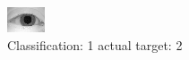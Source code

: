 \begin{figure}[h!]
\begin{center}
\includegraphics[width=0.60\columnwidth]{figures/ID870_class_1_target_2.png}
\end{center}
\caption{ Classification: 1 actual target: 2}
\label{fig:ID870_class_1_target_2}
\end{figure}
